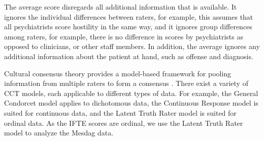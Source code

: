 \documentclass[a4paper,11pt]{article}
\begin{document}
The average score disregards all additional information that is available.
It ignores the individual differences between raters, for example, this assumes that all psychiatrists score hostility in the same way, and it ignores group differences among raters, for example, there is no difference in scores by psychiatrists as opposed to clinicians, or other staff members.
In addition, the average ignores any additional information about the patient at hand, such as offense and diagnosis.

Cultural consensus theory provides a model-based framework for pooling information from multiple raters to form a consensus \parencite{anders2014cultural}.
There exist a variety of CCT models, each applicable to different types of data.
For example, the General Condorcet model \parencite{Batchelder1986statistical} applies to dichotomous data, the Continuous Response model \parencite{anders2014cultural} is suited for continuous data, and the Latent Truth Rater model \parencite{Anders2015cultural} is suited for ordinal data.
As the IFTE scores are ordinal, we use the Latent Truth Rater model to analyze the Mesdag data.
\end{document}
